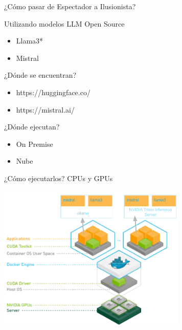 \documentclass[table, unknownkeysallowed, 10pt]{beamer}
\begin{document}
\begin{frame}{¿Cómo pasar de Espectador a Ilusionista?}

    \begin{block}{Utilizando modelos LLM Open Source}
        \begin{itemize}
            \item Llama3*
            \item Mistral
        \end{itemize}
    \end{block}
    \begin{block}{¿Dónde se encuentran?}
        \begin{itemize}
            \item https://huggingface.co/
            \item https://mistral.ai/
        \end{itemize}
    \end{block}

    \begin{block}{¿Dónde ejecutan?}
        \begin{itemize}
            \item On Premise
            \item Nube
        \end{itemize}
    \end{block}

\end{frame}

\begin{frame}{¿Cómo ejecutarlos? CPUs y GPUs}

        \begin{center}
            \includegraphics[width=9cm]{imagenes/docker.png}
        \end{center}

\end{frame}
\end{document}
